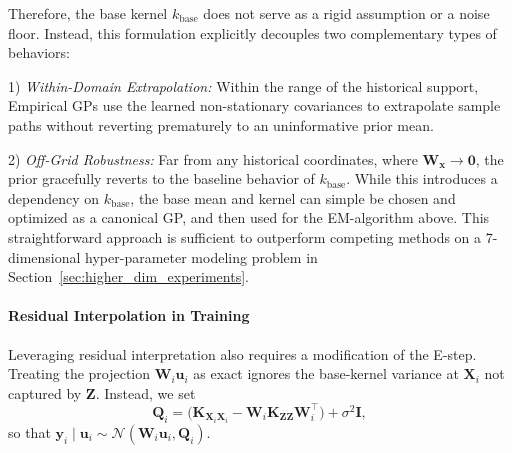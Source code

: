 \documentclass{article}
\begin{document}
Therefore, the base kernel $k_{\text{base}}$ does not serve as a rigid assumption or a noise floor.
Instead, this formulation explicitly decouples two complementary types of behaviors:

1) {\it Within-Domain Extrapolation:} Within the range of the historical support, Empirical GPs use the learned non-stationary covariances to extrapolate sample paths without reverting prematurely to an uninformative prior mean.

2) {\it Off-Grid Robustness:} Far from any historical coordinates,
where $\mathbf{W}_{\mathbf{x}} \to \mathbf{0}$,
the prior gracefully reverts to the baseline behavior of $k_{\text{base}}$.
While this introduces a dependency on $k_{\text{base}}$,
the base mean and kernel can simple be chosen and optimized as a canonical GP,
and then used for the EM-algorithm above.
This straightforward approach is sufficient to outperform competing methods on
a 7-dimensional hyper-parameter modeling problem in Section~\ref{sec:higher_dim_experiments}.

\paragraph{Residual Interpolation in Training}
Leveraging residual interpretation also requires a modification of the E-step.
Treating the projection
$\mathbf{W}_i\mathbf{u}_i$ as exact ignores the base-kernel variance at
$\mathbf{X}_i$ not captured by $\mathbf{Z}$.
Instead, we set
\begin{equation}
\nonumber
    \mathbf{Q}_i = \big(\mathbf{K}_{\mathbf{X}_i\mathbf{X}_i}
    - \mathbf{W}_i \mathbf{K}_{\mathbf{ZZ}} \mathbf{W}_i^\top\big) + \sigma^2 \mathbf{I},
\end{equation}
so that $\mathbf{y}_i \mid \mathbf{u}_i \sim \mathcal{N}(\mathbf{W}_i\mathbf{u}_i, \mathbf{Q}_i)$.
\end{document}
